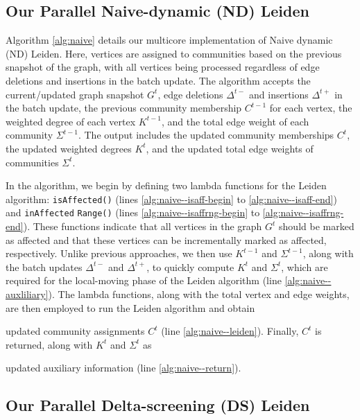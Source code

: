 \subsection{Our Parallel Naive-dynamic (ND) Leiden}
\label{sec:our-naive}

Algorithm \ref{alg:naive} details our multicore implementation of Naive dynamic (ND) Leiden. Here, vertices are assigned to communities based on the previous snapshot of the graph, with all vertices being processed regardless of edge deletions and insertions in the batch update. The algorithm accepts the current/updated graph snapshot $G^t$, edge deletions $\Delta^{t-}$ and insertions $\Delta^{t+}$ in the batch update, the previous community membership $C^{t-1}$ for each vertex, the weighted degree of each vertex $K^{t-1}$, and the total edge weight of each community $\Sigma^{t-1}$. The output includes the updated community memberships $C^t$, the updated weighted degrees $K^t$, and the updated total edge weights of communities $\Sigma^t$.

In the algorithm, we begin by defining two lambda functions for the Leiden algorithm: \texttt{isAffected()} (lines \ref{alg:naive--isaff-begin} to \ref{alg:naive--isaff-end}) and \texttt{inAffected} \texttt{Range()} (lines \ref{alg:naive--isaffrng-begin} to \ref{alg:naive--isaffrng-end}). These functions indicate that all vertices in the graph $G^t$ should be marked as affected and that these vertices can be incrementally marked as affected, respectively. Unlike previous approaches, we then use $K^{t-1}$ and $\Sigma^{t-1}$, along with the batch updates $\Delta^{t-}$ and $\Delta^{t+}$, to quickly compute $K^t$ and $\Sigma^t$, which are required for the local-moving phase of the Leiden algorithm (line \ref{alg:naive--auxliliary}). The lambda functions, along with the total vertex and edge weights, are then employed to run the Leiden algorithm and obtain updated community assignments $C^t$ (line \ref{alg:naive--leiden}). Finally, $C^t$ is returned, along with $K^t$ and $\Sigma^t$ as updated auxiliary information (line \ref{alg:naive--return}).




\subsection{Our Parallel Delta-screening (DS) Leiden}
\label{sec:our-delta}

